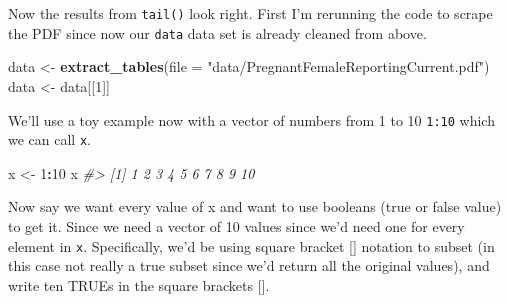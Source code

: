 \documentclass[
  12pt,
]{book}
\newenvironment{Shaded}{\begin{snugshade}}{\end{snugshade}}
\newcommand{\CommentTok}[1]{\textcolor[rgb]{0.56,0.35,0.01}{\textit{#1}}}
\newcommand{\DataTypeTok}[1]{\textcolor[rgb]{0.13,0.29,0.53}{#1}}
\newcommand{\DecValTok}[1]{\textcolor[rgb]{0.00,0.00,0.81}{#1}}
\newcommand{\KeywordTok}[1]{\textcolor[rgb]{0.13,0.29,0.53}{\textbf{#1}}}
\newcommand{\NormalTok}[1]{#1}
\newcommand{\OperatorTok}[1]{\textcolor[rgb]{0.81,0.36,0.00}{\textbf{#1}}}
\newcommand{\StringTok}[1]{\textcolor[rgb]{0.31,0.60,0.02}{#1}}
\begin{document}
\begin{Shaded}
\end{Shaded}

Now the results from \texttt{tail()} look right. First I'm rerunning the code to scrape the PDF since now our \texttt{data} data set is already cleaned from above.

\begin{Shaded}
\begin{Highlighting}[]
\NormalTok{data <{-}}\StringTok{ }\KeywordTok{extract\_tables}\NormalTok{(}\DataTypeTok{file =} \StringTok{"data/PregnantFemaleReportingCurrent.pdf"}\NormalTok{)}
\NormalTok{data <{-}}\StringTok{ }\NormalTok{data[[}\DecValTok{1}\NormalTok{]]}
\end{Highlighting}
\end{Shaded}

We'll use a toy example now with a vector of numbers from 1 to 10 \texttt{1:10} which we can call \texttt{x}.

\begin{Shaded}
\begin{Highlighting}[]
\NormalTok{x <{-}}\StringTok{ }\DecValTok{1}\OperatorTok{:}\DecValTok{10}
\NormalTok{x}
\CommentTok{\#>  [1]  1  2  3  4  5  6  7  8  9 10}
\end{Highlighting}
\end{Shaded}

Now say we want every value of x and want to use booleans (true or false value) to get it. Since we need a vector of 10 values since we'd need one for every element in \texttt{x}. Specifically, we'd be using square bracket {[}{]} notation to subset (in this case not really a true subset since we'd return all the original values), and write ten TRUEs in the square brackets {[}{]}.
\end{document}
